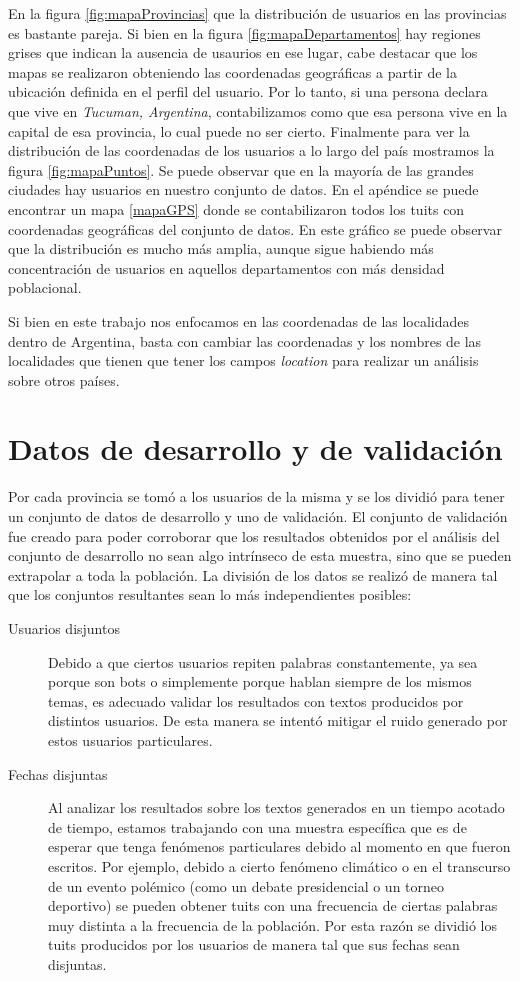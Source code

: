 En la figura \ref{fig:mapaProvincias} que la distribución de usuarios en las provincias es bastante pareja. Si bien en la figura \ref{fig:mapaDepartamentos} hay regiones grises que indican la ausencia de usaurios en ese lugar, cabe destacar que los mapas se realizaron obteniendo las coordenadas geográficas a partir de la ubicación definida en el perfil del usuario. Por lo tanto, si una persona declara que vive en \textit{Tucuman, Argentina}, contabilizamos como que esa persona vive en la capital de esa provincia, lo cual puede no ser cierto. Finalmente para ver la distribución de las coordenadas de los usuarios a lo largo del país mostramos la figura \ref{fig:mapaPuntos}. Se puede observar que en la mayoría de las grandes ciudades hay usuarios en nuestro conjunto de datos. En el apéndice se puede encontrar un mapa \ref{mapaGPS} donde se contabilizaron todos los tuits con coordenadas geográficas del conjunto de datos. En este gráfico se puede observar que la distribución es mucho más amplia, aunque sigue habiendo más concentración de usuarios en aquellos departamentos con más densidad poblacional.

Si bien en este trabajo nos enfocamos en las coordenadas de las localidades dentro de Argentina, basta con cambiar las coordenadas y los nombres de las localidades que tienen que tener los campos \textit{location} para realizar un análisis sobre otros países.


\section{Datos de desarrollo y de validación}

Por cada provincia se tomó a los usuarios de la misma y se los dividió para tener un conjunto de datos de desarrollo y uno de validación. El conjunto de validación fue creado para poder corroborar que los resultados obtenidos por el análisis del conjunto de desarrollo no sean algo intrínseco de esta muestra, sino que se pueden extrapolar a toda la población. 
La división de los datos se realizó de manera tal que los conjuntos resultantes sean lo más independientes posibles: 
\begin{description}
    \item [Usuarios disjuntos] Debido a que ciertos usuarios repiten palabras constantemente, ya sea porque son bots o simplemente porque hablan siempre de los mismos temas, es adecuado validar los resultados con textos producidos por distintos usuarios. De esta manera se intentó mitigar el ruido generado por estos usuarios particulares.
    \item [Fechas disjuntas] Al analizar los resultados sobre los textos generados en un tiempo acotado de tiempo, estamos trabajando con una muestra específica que es de esperar que tenga fenómenos particulares debido al momento en que fueron escritos. Por ejemplo, debido a cierto fenómeno climático o en el transcurso de un evento polémico (como un debate presidencial o un torneo deportivo) se pueden obtener tuits con una frecuencia de ciertas palabras muy distinta a la frecuencia de la población. Por esta razón se dividió los tuits producidos por los usuarios de manera tal que sus fechas sean disjuntas.
\end{description}

